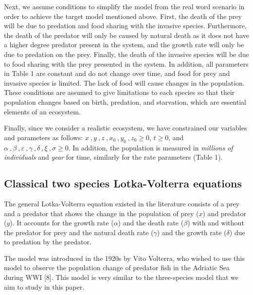 \documentclass{article}
\begin{document}
\vspace{5mm}

\noindent Next, we assume conditions to simplify the model from the real word scenario in order to achieve the target model mentioned above. First, the death of the prey will be due to predation and food sharing with the invasive species. Furthermore, the death of the predator will only be caused by natural death as it does not have a higher degree predator present in the system, and the growth rate will only be due to predation on the prey. Finally, the death of the invasive species will be due to food sharing with the prey presented in the system. In addition, all parameters in Table 1 are constant and do not change over time, and food for prey and invasive species is limited. The lack of food will cause changes in the population. These conditions are assumed to give limitations to each species so that their population changes based on birth, predation, and starvation, which are essential elements of an ecosystem.

\vspace{5mm}

\noindent Finally, since we consider a realistic ecosystem, we have constrained our variables and parameters as follows: $x\ , y \ , z \ , x_0 \ , y_0 \ , z_0 \ge 0$, $t\ge0$, and $\alpha \ , \beta \ , \varepsilon \ , \gamma \ , \delta \ , \xi \ , \sigma \ge0$. In addition, the population is measured in \textit{millions of individuals} and \textit{year} for time, similarly for the rate parameters (Table 1).

\subsection{Classical two species Lotka-Volterra equations}
\noindent The general Lotka-Volterra equation existed in the literature consists of a prey and a predator that shows the change in the population of prey ($x$) and predator ($y$). It accounts for the growth rate ($\alpha$) and the death rate ($\beta$) with and without the predator for prey and the natural death rate ($\gamma$) and the growth rate ($\delta$) due to predation by the predator. 

\vspace{5mm}

\noindent The model was introduced in the 1920s by Vito Volterra, who wished to use this model to observe the population change of predator fish in the Adriatic Sea during WWI [8]. This model is very similar to the three-species model that we aim to study in this paper. 
\end{document}
